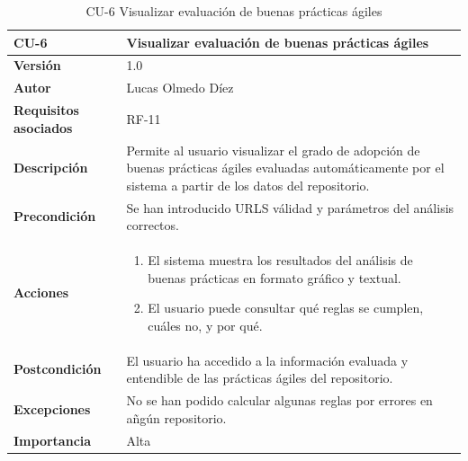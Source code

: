 \clearpage
\begin{table}[p]
    \centering
    \begin{tabularx}{\linewidth}{ p{} p{} }
        \toprule
        \textbf{CU-6} & Visualizar evaluación de buenas prácticas ágiles \\
        \midrule
        \textbf{Versión} & 1.0 \\
        \textbf{Autor} & Lucas Olmedo Díez \\
        \textbf{Requisitos asociados} & RF-11 \\
        \textbf{Descripción} & Permite al usuario visualizar el grado de adopción de buenas prácticas ágiles evaluadas automáticamente por el sistema a partir de los datos del repositorio. \\
        \textbf{Precondición} & Se han introducido URLS válidad y parámetros del análisis correctos. \\
        \textbf{Acciones} &
        \begin{enumerate}
            \def\labelenumi{\arabic{enumi}.}
            \tightlist
            \item El sistema muestra los resultados del análisis de buenas prácticas en formato gráfico y textual.
            \item El usuario puede consultar qué reglas se cumplen, cuáles no, y por qué.
        \end{enumerate}\\
        \textbf{Postcondición} & El usuario ha accedido a la información evaluada y entendible de las prácticas ágiles del repositorio. \\
        \textbf{Excepciones} & No se han podido calcular algunas reglas por errores en añgún repositorio. \\
        \textbf{Importancia} & Alta \\
        \bottomrule
    \end{tabularx}
    \caption{CU-6 Visualizar evaluación de buenas prácticas ágiles}
\end{table}

